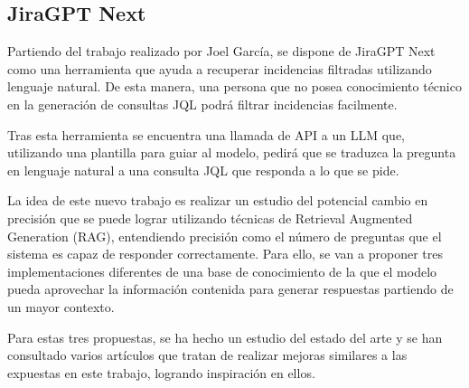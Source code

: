 \subsection{JiraGPT Next}
Partiendo del trabajo realizado por Joel García, se dispone de JiraGPT Next como una herramienta que ayuda a recuperar incidencias filtradas utilizando lenguaje natural. De esta manera, una persona que no posea conocimiento técnico en la generación de consultas JQL podrá filtrar incidencias facilmente.

Tras esta herramienta se encuentra una llamada de API a un LLM que, utilizando una plantilla para guiar al modelo, pedirá que se traduzca la pregunta en lenguaje natural a una consulta JQL que responda a lo que se pide.

La idea de este nuevo trabajo es realizar un estudio del potencial cambio en precisión que se puede lograr utilizando técnicas de Retrieval Augmented Generation (RAG), entendiendo precisión como el número de preguntas que el sistema es capaz de responder correctamente. Para ello, se van a proponer tres implementaciones diferentes de una base de conocimiento de la que el modelo pueda aprovechar la información contenida para generar respuestas partiendo de un mayor contexto. 

Para estas tres propuestas, se ha hecho un estudio del estado del arte y se han consultado varios artículos que tratan de realizar mejoras similares a las expuestas en este trabajo, logrando inspiración en ellos.